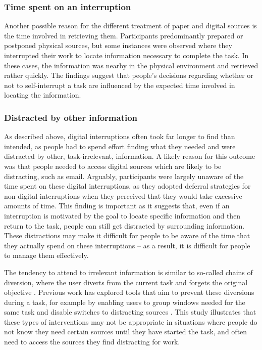 \subsubsection{Time spent on an interruption}
Another possible reason for the different treatment of paper and digital sources is the time involved in retrieving them. Participants predominantly prepared or postponed physical sources, but some instances were observed where they interrupted their work to locate information necessary to complete the task. In these cases, the information was nearby in the physical environment and retrieved rather quickly. The findings suggest that people's decisions regarding whether or not to self-interrupt a task are influenced by the expected time involved in locating the information.

\subsubsection{Distracted by other information}
As described above, digital interruptions often took far longer to find than intended, as people had to spend effort finding what they needed and were distracted by other, task-irrelevant, information. A likely reason for this outcome was that people needed to access digital sources which are likely to be distracting, such as email. Arguably, participants were largely unaware of the time spent on these digital interruptions, as they adopted deferral strategies for non-digital interruptions when they perceived that they would take excessive amounts of time. This finding is important as it suggests that, even if an interruption is motivated by the goal to locate specific information and then return to the task, people can still get distracted by surrounding information. These distractions may make it difficult for people to be aware of the time that they actually spend on these interruptions – as a result, it is difficult for people to manage them effectively.

The tendency to attend to irrelevant information is similar to so-called chains of diversion, where the user diverts from the current task and forgets the original objective \citep{Hanrahan2015, Iqbal2007}. Previous work has explored tools that aim to prevent these diversions during a task, for example by enabling users to group windows needed for the same task \citep{Smith2003} and disable switches to distracting sources \citep{Kim2017}. This study illustrates that these types of interventions may not be appropriate in situations where people do not know they need certain sources until they have started the task, and often need to access the sources they find distracting for work.

